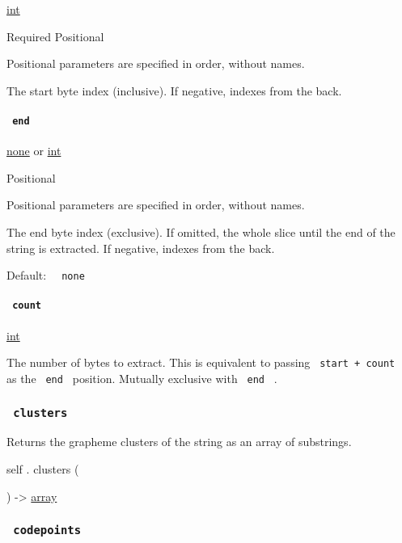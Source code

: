 \href{/docs/reference/foundations/int/}{int}

{Required} {{ Positional }}

\label{definitions-slice-start-positional-tooltip}
Positional parameters are specified in order, without names.

The start byte index (inclusive). If negative, indexes from the back.

\paragraph{\texorpdfstring{\texttt{\ end\ }}{ end }}\label{definitions-slice-end}

\href{/docs/reference/foundations/none/}{none} {or}
\href{/docs/reference/foundations/int/}{int}

{{ Positional }}

\label{definitions-slice-end-positional-tooltip}
Positional parameters are specified in order, without names.

The end byte index (exclusive). If omitted, the whole slice until the
end of the string is extracted. If negative, indexes from the back.

Default: \texttt{\ }{\texttt{\ none\ }}\texttt{\ }

\paragraph{\texorpdfstring{\texttt{\ count\ }}{ count }}\label{definitions-slice-count}

\href{/docs/reference/foundations/int/}{int}

The number of bytes to extract. This is equivalent to passing
\texttt{\ start\ +\ count\ } as the \texttt{\ end\ } position. Mutually
exclusive with \texttt{\ end\ } .

\subsubsection{\texorpdfstring{\texttt{\ clusters\ }}{ clusters }}\label{definitions-clusters}

Returns the grapheme clusters of the string as an array of substrings.

self { . } { clusters } (

) -\textgreater{} \href{/docs/reference/foundations/array/}{array}

\subsubsection{\texorpdfstring{\texttt{\ codepoints\ }}{ codepoints }}\label{definitions-codepoints}

